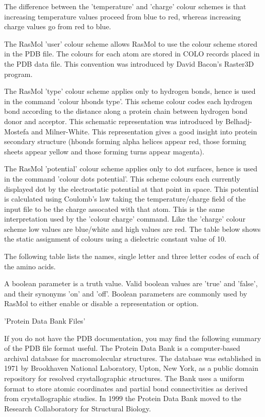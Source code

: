 The difference between the
'temperature'
and
'charge'
colour schemes is that increasing temperature values proceed from blue
to red, whereas increasing charge values go from red to blue.

The RasMol
'user'
colour scheme allows RasMol to use the colour scheme stored in the
PDB file. The colours for each atom are stored in COLO records placed
in the PDB data file. This convention was introduced by David Bacon's
Raster3D program.

The RasMol
'type'
colour scheme applies only to hydrogen bonds, hence is used in the command
'colour hbonds type'.
This scheme colour codes each hydrogen bond according to the
distance along a protein chain between hydrogen bond donor and acceptor.
This schematic representation was introduced by Belhadj-Mostefa and
Milner-White. This representation gives a good insight into protein
secondary structure (hbonds forming alpha helices appear red, those
forming sheets appear yellow and those forming turns appear magenta).

The RasMol
'potential'
colour scheme applies only to dot surfaces, hence is used in the command
'colour dots potential'.
This scheme colours each currently displayed dot by the electrostatic
potential at that point in space. This potential is calculated using
Coulomb's law taking the temperature/charge field of the input file to
be the charge assocated with that atom. This is the same interpretation
used by the
'colour charge'
command. Like the
'charge'
colour scheme low values are blue/white and high values are red.
The table below shows the static assignment of colours using a
dielectric constant value of 10.

The following table lists the names, single letter and three letter
codes of each of the amino acids.

A boolean parameter is a truth value. Valid boolean values are 'true' and
'false', and their synonyms 'on' and 'off'. Boolean parameters are commonly
used by RasMol to either enable or disable a representation or option.

'Protein Data Bank Files'

If you do not have the PDB documentation, you may find the
following summary of the PDB file format useful. The Protein Data Bank
is a computer-based archival database for macromolecular structures.
The database was established in 1971 by Brookhaven National
Laboratory, Upton, New York, as a public domain repository for resolved
crystallographic structures. The Bank uses a uniform format to store
atomic coordinates and partial bond connectivities as derived from
crystallographic studies.  In 1999 the Protein Data Bank moved
to the Research Collaboratory for Structural Biology.

